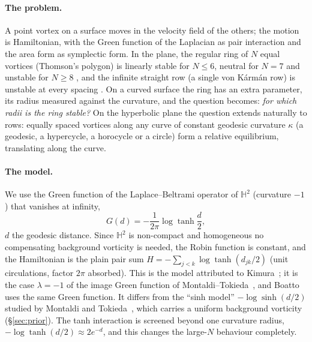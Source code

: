 \documentclass[11pt]{article}
\theoremstyle{definition}
\theoremstyle{remark}
\newcommand{\HH}{\mathbb H^2}
\begin{document}
\paragraph{The problem.} A point vortex on a surface moves in the velocity field of the others; the motion is Hamiltonian,
with the Green function of the Laplacian as pair interaction and the area form as symplectic form. In the plane, the regular
ring of $N$ equal vortices (Thomson's polygon) is linearly stable for $N\le6$, neutral for $N=7$ and unstable for $N\ge8$
\cite{Havelock1931}, and the infinite straight row (a single von K\'arm\'an row) is unstable at every spacing
\cite{vonKarman1912,Lamb1932,Aref1995}. On a curved surface the ring has an extra parameter, its radius measured against the
curvature, and the question becomes: \emph{for which radii is the ring stable?} On the hyperbolic plane the question extends
naturally to rows: equally spaced vortices along any curve of constant geodesic curvature $\kappa$ (a geodesic, a
hypercycle, a horocycle or a circle) form a relative equilibrium, translating along the curve.

\paragraph{The model.} We use the Green function of the Laplace--Beltrami operator of $\HH$ (curvature $-1$) that vanishes at
infinity,
\[
G(d)=-\frac1{2\pi}\log\tanh\frac d2,
\]
$d$ the geodesic distance. Since $\HH$ is non-compact and homogeneous no compensating background vorticity is needed, the
Robin function is constant, and the Hamiltonian is the plain pair sum $H=-\sum_{j<k}\log\tanh(d_{jk}/2)$ (unit circulations,
factor $2\pi$ absorbed). This is the model attributed to Kimura~\cite{Kimura1999}; it is the case $\lambda=-1$ of the image
Green function of Montaldi--Tokieda~\cite[\S4.2]{MontaldiTokieda2013}, and Boatto~\cite{Boatto2008} uses the same Green function.
It differs from the ``sinh model'' $-\log\sinh(d/2)$ studied by Montaldi and Tokieda~\cite{MontaldiTokieda2013}, which
carries a uniform background vorticity (\S\ref{sec:prior}). The tanh interaction is screened beyond one curvature radius,
$-\log\tanh(d/2)\approx2e^{-d}$, and this changes the large-$N$ behaviour completely.
\end{document}
